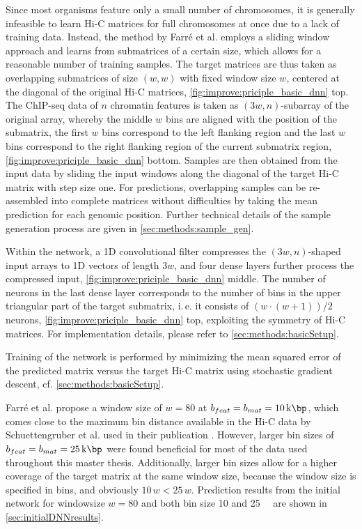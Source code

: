 Since most organisms feature only a small number of chromosomes, 
it is generally infeasible to learn Hi-C matrices for full chromosomes at once due to a lack of training data.
Instead, the method by Farr\'e et al. employs a sliding window approach and learns from submatrices of a certain size, 
which allows for a reasonable number of training samples.
The target matrices are thus taken as overlapping submatrices of size $(w, w)$ 
with fixed window size $w$, centered at the diagonal of the 
original Hi-C matrices, \cref{fig:improve:priciple_basic_dnn} top.
The ChIP-seq data of $n$ chromatin features is taken as $(3w, n)$-subarray of the original array,
whereby the middle $w$ bins are aligned with the position of the submatrix,
the first $w$ bins correspond to the left flanking region and the last $w$ bins correspond to 
the right flanking region of the current submatrix region, \cref{fig:improve:priciple_basic_dnn} bottom. 
Samples are then obtained from the input data by sliding 
the input windows along the diagonal of the target Hi-C matrix with step size one. 
For predictions, overlapping samples can be re-assembled into complete matrices without difficulties
by taking the mean prediction for each genomic position.
Further technical details of the sample generation process are given in \cref{sec:methods:sample_gen}.

Within the network, a 1D convolutional filter compresses the $(3w, n)$-shaped input arrays to 1D vectors
of length $3w$, and four dense layers further process the compressed input, \cref{fig:improve:priciple_basic_dnn} middle.
The number of neurons in the last dense layer corresponds to the number of bins
in the upper triangular part of the target submatrix, i.\,e. it consists of $(w \cdot (w+1))/2$ neurons, \cref{fig:improve:priciple_basic_dnn} top, 
exploiting the symmetry of Hi-C matrices. 
For implementation details, please refer to \cref{sec:methods:basicSetup}.

Training of the network is performed by minimizing the mean squared error of the predicted matrix
versus the target Hi-C matrix using stochastic gradient descent, cf. \cref{sec:methods:basicSetup}.

Farr\'e et al. propose a window size of $w=80$ at $b_{feat} = b_{mat} = \SI{10}{\kilo\bp}$,
which comes close to the maximum bin distance available in the Hi-C data by Schuettengruber et al. \cite{Schuettengruber2014} used in their publication \cite{Farre2018a}.
However, larger bin sizes of $b_{feat} = b_{mat} = \SI{25}{\kilo\bp}$ were found beneficial for 
most of the data used throughout this master thesis.
Additionally, larger bin sizes allow for a higher coverage of the target matrix at the same window size,
because the window size is specified in bins, and obviously $10\, w < 25\, w$.
Prediction results from the initial network for windowsize $w=80$ and both bin size 10 and \SI{25}{\kilo\bp} are shown in \cref{sec:initialDNNresults}.

